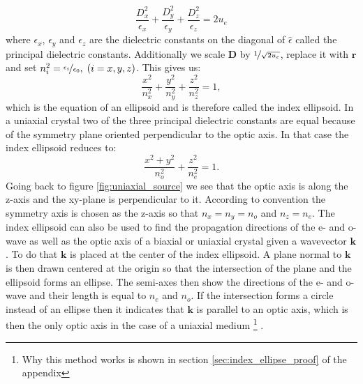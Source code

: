\begin{equation}
    \frac{D_x^2}{\epsilon_x}+\frac{D_y^2}{\epsilon_y}+\frac{D_z^2}{\epsilon_z}= 2u_e
\end{equation}
where $\epsilon_x$, $\epsilon_y$ and $\epsilon_z$ are the dielectric constants on the diagonal of $\hat{\epsilon}$ called the principal dielectric constants. Additionally we scale $\bm{D}$ by $\nicefrac{1}{\sqrt{2u_e}}$, replace it with $\bm{r}$ and set $n_i^2 = \nicefrac{\epsilon_i}{\epsilon_0},\; (i=x,y,z)$. This gives us:
\begin{equation}
    \frac{x^2}{n_x^2}+\frac{y^2}{n_y^2}+\frac{z^2}{n_z^2}=1,
\end{equation}
which is the equation of an ellipsoid and is therefore called the index ellipsoid. In a uniaxial crystal two of the three principal dielectric constants are equal because of the symmetry plane oriented perpendicular to the optic axis. In that case the index ellipsoid reduces to:
\begin{equation}
    \label{eq:negative_index_ellipsod}
    \frac{x^2+y^2}{n_o^2}+\frac{z^2}{n_e^2}=1.
\end{equation}
Going back to figure \ref{fig:uniaxial_source} we see that the optic axis is along the z-axis and the xy-plane is perpendicular to it. According to convention the symmetry axis is chosen as the z-axis so that $n_x=n_y=n_o$ and $n_z=n_e$. The index ellipsoid can also be used to find the propagation directions of the e- and o-wave as well as the optic axis of a biaxial or uniaxial crystal given a wavevector $\bm{k}$. To do that $\bm{k}$ is placed at the center of the index ellipsoid. A plane normal to $\bm{k}$ is then drawn centered at the origin so that the intersection of the plane and the ellipsoid forms an ellipse. The semi-axes then show the directions of the e- and o-wave and their length is equal to $n_e$ and $n_o$. If the intersection forms a circle instead of an ellipse then it indicates that $\bm{k}$ is parallel to an optic axis, which is then the only optic axis in the case of a uniaxial medium \footnote{Why this method works is shown in section \ref{sec:index_ellipse_proof} of the appendix} \cite{Yariv1984OpticalRadiation, Griffiths2017IntroductionElectrodynamics}. 
